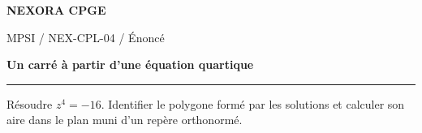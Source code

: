 \documentclass[11pt,a4paper]{article}
\begin{document}
{\small\bfseries\color{nexorablue} NEXORA CPGE}\par
{\small MPSI / NEX-CPL-04 / Énoncé}\par
{\LARGE\bfseries Un carré à partir d’une équation quartique}\par
\vspace{0.25em}\hrule\vspace{0.6em}

Résoudre $z^4=-16$. Identifier le polygone formé par les solutions et calculer son aire dans le plan muni d’un repère orthonormé.
\end{document}
